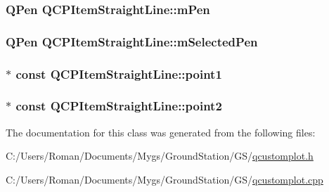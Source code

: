 \subsubsection[{m\+Pen}]{\setlength{\rightskip}{0pt plus 5cm}Q\+Pen Q\+C\+P\+Item\+Straight\+Line\+::m\+Pen\hspace{0.3cm}{\ttfamily [protected]}}\label{class_q_c_p_item_straight_line_a15106ddc2ebd73ed5c1bc57aa92bee8f}
\hypertarget{class_q_c_p_item_straight_line_a0307a0d56a018656adbf798bc84c2a4b}{}
\subsubsection[{m\+Selected\+Pen}]{\setlength{\rightskip}{0pt plus 5cm}Q\+Pen Q\+C\+P\+Item\+Straight\+Line\+::m\+Selected\+Pen\hspace{0.3cm}{\ttfamily [protected]}}\label{class_q_c_p_item_straight_line_a0307a0d56a018656adbf798bc84c2a4b}
\hypertarget{class_q_c_p_item_straight_line_ac131a6ffe456f2cc7364dce541fe0120}{}
\subsubsection[{point1}]{$\ast$ const Q\+C\+P\+Item\+Straight\+Line\+::point1}\label{class_q_c_p_item_straight_line_ac131a6ffe456f2cc7364dce541fe0120}
\hypertarget{class_q_c_p_item_straight_line_ad26c0a732e471f63f75d481dcd48cfc9}{}
\subsubsection[{point2}]{$\ast$ const Q\+C\+P\+Item\+Straight\+Line\+::point2}\label{class_q_c_p_item_straight_line_ad26c0a732e471f63f75d481dcd48cfc9}


The documentation for this class was generated from the following files\+:\begin{DoxyCompactItemize}
\item 
C\+:/\+Users/\+Roman/\+Documents/\+Mygs/\+Ground\+Station/\+G\+S/\hyperlink{qcustomplot_8h}{qcustomplot.\+h}\item 
C\+:/\+Users/\+Roman/\+Documents/\+Mygs/\+Ground\+Station/\+G\+S/\hyperlink{qcustomplot_8cpp}{qcustomplot.\+cpp}\end{DoxyCompactItemize}
